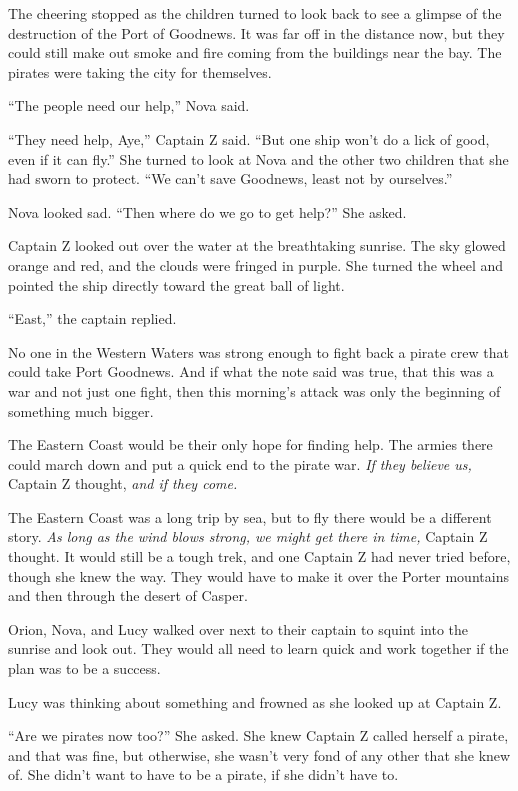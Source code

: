 \documentclass[12pt]{extbook}
\begin{document}
  The cheering stopped as the children turned to look back to see a
  glimpse of the destruction of the Port of Goodnews. It was far off in
  the distance now, but they could still make out smoke and fire coming
  from the buildings near the bay. The pirates were taking the city for
  themselves.
  
  \enquote{The people need our help,} Nova said.
  
  \enquote{They need help, Aye,} Captain Z said. \enquote{But one ship
  won't do a lick of good, even if it can fly.} She turned to look at Nova
  and the other two children that she had sworn to protect. \enquote{We
  can't save Goodnews, least not by ourselves.}
  
  Nova looked sad. \enquote{Then where do we go to get help?} She asked.
  
  Captain Z looked out over the water at the breathtaking sunrise. The sky
  glowed orange and red, and the clouds were fringed in purple. She turned
  the wheel and pointed the ship directly toward the great ball of light.
  
  \enquote{East,} the captain replied.
  
  No one in the Western Waters was strong enough to fight back a pirate
  crew that could take Port Goodnews. And if what the note said was true,
  that this was a war and not just one fight, then this morning's attack
  was only the beginning of something much bigger.
  
  The Eastern Coast would be their only hope for finding help. The armies
  there could march down and put a quick end to the pirate war. \emph{If
  they believe us,} Captain Z thought, \emph{and if they come.}
  
  The Eastern Coast was a long trip by sea, but to fly there would be a
  different story. \emph{As long as the wind blows strong, we might get
  there in time,} Captain Z thought. It would still be a tough trek, and
  one Captain Z had never tried before, though she knew the way. They
  would have to make it over the Porter mountains and then through the
  desert of Casper.
  
  Orion, Nova, and Lucy walked over next to their captain to squint into
  the sunrise and look out. They would all need to learn quick and work
  together if the plan was to be a success.
  
  Lucy was thinking about something and frowned as she looked up at
  Captain Z.
  
  \enquote{Are we pirates now too?} She asked. She knew Captain Z called
  herself a pirate, and that was fine, but otherwise, she wasn't very fond
  of any other that she knew of. She didn't want to have to be a pirate,
  if she didn't have to.
  
\end{document}
